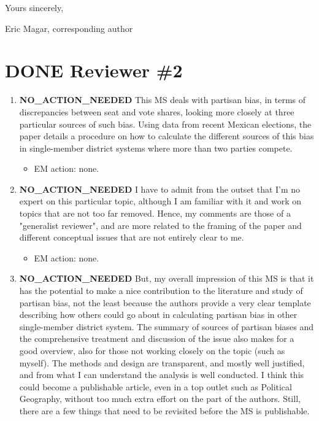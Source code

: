 \documentclass{article}
\begin{document}
Yours sincerely,

Eric Magar, corresponding author

\section{{\bfseries\sffamily DONE} Reviewer \#2}
\label{sec:orgheadline15}
\begin{enumerate}
\item {\bfseries\sffamily NO\_ACTION\_NEEDED} This MS deals with partisan bias, in terms of discrepancies between seat and vote shares, looking more closely at three particular sources of such bias. Using data from recent Mexican elections, the paper details a procedure on how to calculate the different sources of this bias in single-member district systems where more than two parties compete.
\label{sec:orgheadline2}
\begin{itemize}
\item EM action: none.
\end{itemize}
\item {\bfseries\sffamily NO\_ACTION\_NEEDED} I have to admit from the outset that I'm no expert on this particular topic, although I am familiar with it and work on topics that are not too far removed. Hence, my comments are those of a "generalist reviewer", and are more related to the framing of the paper and different conceptual issues that are not entirely clear to me.
\label{sec:orgheadline3}
\begin{itemize}
\item EM action: none.
\end{itemize}
\item {\bfseries\sffamily NO\_ACTION\_NEEDED} But, my overall impression of this MS is that it has the potential to make a nice contribution to the literature and study of partisan bias, not the least because the authors provide a very clear template describing how others could go about in calculating partisan bias in other single-member district system. The summary of sources of partisan biases and the comprehensive treatment and discussion of the issue also makes for a good overview, also for those not working closely on the topic (such as myself). The methods and design are transparent, and mostly well justified, and from what I can understand the analysis is well conducted. I think this could become a publishable article, even in a top outlet such as Political Geography, without too much extra effort on the part of the authors. Still, there are a few things that need to be revisited before the MS is publishable.

\end{enumerate}
\end{document}
